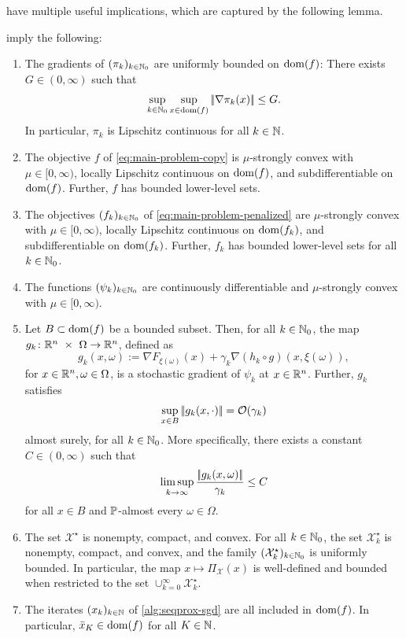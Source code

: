 have multiple useful implications, which are captured
by the following lemma.
\begin{lemma}
    \label{lem:basic-properties}
     imply the following:
    \begin{enumerate}
        \item The gradients of $(\pi_k)_{k\in\mathbb{N}_0}$ are uniformly bounded on $\operatorname{dom}(f)$:
        There exists $G\in(0,\infty)$ such that
            \[
                \sup_{k\in\mathbb{N}_0} \sup_{x\in\operatorname{dom}(f)} |\!|\nabla \pi_k(x)|\!| \leq G.
            \]
            In particular, $\pi_k$ is Lipschitz continuous for all $k\in\mathbb{N}$.
        \item The objective $f$ of \eqref{eq:main-problem-copy} is $\mu$-strongly convex with
            $\mu\in[0, \infty)$, locally
            Lipschitz continuous on $\operatorname{dom}(f)$, and subdifferentiable on $\operatorname{dom}(f)$. Further,
            $f$ has bounded lower-level sets.
        \item The objectives $(f_k)_{k\in\mathbb{N}_0}$ of \eqref{eq:main-problem-penalized} are
        $\mu$-strongly convex with $\mu\in[0, \infty)$, locally
            Lipschitz continuous on $\operatorname{dom}(f_k)$, and subdifferentiable on $\operatorname{dom}(f_k)$.
            Further, $f_k$ has bounded lower-level sets for all $k\in\mathbb{N}_0$.
        \item The functions $(\psi_k)_{k\in\mathbb{N}_0}$ are continuously differentiable and $\mu$-strongly convex with
            $\mu\in[0, \infty)$.
        \item Let $B\subset\operatorname{dom}(f)$ be a bounded subset. Then, for all $k\in\mathbb{N}_0$, the map $g_k\colon\mathbb{R}^n~\times~\Omega\to\mathbb{R}^n$,
        defined as
        \[
            g_k(x, \omega) := \nabla F_{\xi(\omega)}(x) + \gamma_k \nabla (h_k \circ g)(x, \xi(\omega)),
        \]
        for $x\in\mathbb{R}^n,\omega\in\Omega$, is a stochastic gradient of $\psi_k$ at $x\in\mathbb{R}^n$. Further, $g_k$
        satisfies
        \[
            \sup_{x\in B} |\!|g_k(x, \cdot)|\!| = \mathcal{O}(\gamma_k)
        \]
        almost surely, for all $k\in\mathbb{N}_0$. More specifically, there exists a constant $C\in(0,\infty)$ such that
        \[
            \limsup_{k\to\infty} \frac{|\!|g_k(x, \omega)|\!|}{\gamma_k} \leq C
        \]
        for all $x\in B$ and $\mathbb{P}$-almost every $\omega\in\Omega$.
        \item The set $\mathcal{X}^\star$ is nonempty, compact, and convex. For all $k\in\mathbb{N}_0$,
            the set $\mathcal{X}_k^\star$ is nonempty, compact, and convex, and the family
            $(\mathcal{X}_k^\star)_{k\in\mathbb{N}_0}$ is uniformly bounded.
            In particular, the map $x\mapsto \Pi_\mathcal{X}(x)$ is well-defined and bounded
            when restricted to the set $\cup_{k=0}^\infty \mathcal{X}_k^\star$.
        \item The iterates $(x_k)_{k\in\mathbb{N}}$ of \cref{alg:seqprox-sgd}
            are all included in $\operatorname{dom}(f)$. In particular,
            $\bar{x}_K \in \operatorname{dom}(f)$ for all $K\in\mathbb{N}$.
    \end{enumerate}
\end{lemma}
